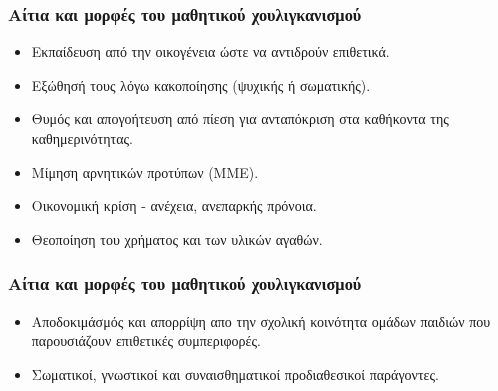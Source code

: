 \documentclass[hyperref={pdfpagelabels=false}, t]{beamer}
\let\olditem=\item%
\renewcommand{\item}{\olditem \justifying}%
\begin{document}
%
%

\begin{frame}[t]
\frametitle{Αίτια και μορφές του μαθητικού χουλιγκανισμού}
\vspace{-18.5pt}
\begin{adjustwidth}{-0.7cm}{}
\justifying
\begin{itemize}
\item Εκπαίδευση από την οικογένεια ώστε να αντιδρούν επιθετικά.
\setlength{\itemsep}{15pt}
\item Eξώθησή τους λόγω κακοποίησης (ψυχικής ή σωματικής).
\setlength{\itemsep}{15pt}
\item Θυμός και απογοήτευση από πίεση για ανταπόκριση στα καθήκοντα της
καθημερινότητας. \setlength{\itemsep}{15pt}
\item Μίμηση αρνητικών προτύπων (ΜΜΕ).
\setlength{\itemsep}{15pt}
\item Οικονομική κρίση - ανέχεια, ανεπαρκής πρόνοια. \setlength{\itemsep}{15pt}
\item Θεοποίηση του χρήματος και των υλικών αγαθών. \setlength{\itemsep}{15pt}
\end{itemize}
\end{adjustwidth}
\end{frame}

%
%

\begin{frame}[t]
\frametitle{Αίτια και μορφές του μαθητικού χουλιγκανισμού}
\vspace{-18.5pt}
\begin{adjustwidth}{-0.7cm}{}
\justifying
\begin{itemize}
\item Aποδοκιμάσμός και απορρίψη απο την σχολική κοινότητα ομάδων παιδιών που
παρουσιάζουν επιθετικές συμπεριφορές. \setlength{\itemsep}{15pt}
\item Σωματικοί, γνωστικοί και συναισθηματικοί προδιαθεσικοί παράγοντες.
\end{itemize}
\end{adjustwidth}
\end{frame}

%
%
\end{document}
